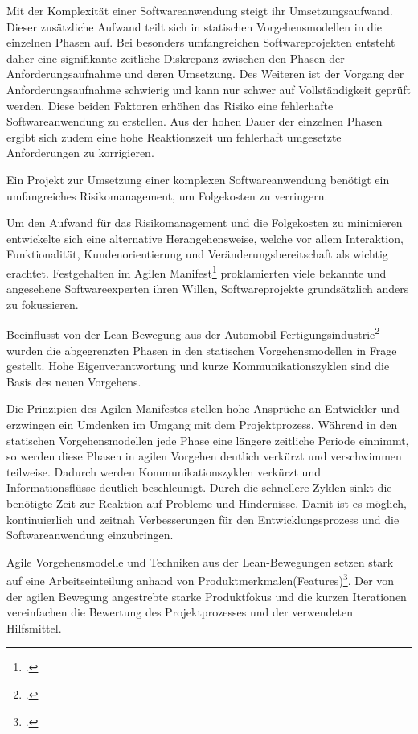 Mit der Komplexität einer Softwareanwendung steigt ihr Umsetzungsaufwand. Dieser zusätzliche Aufwand teilt sich in statischen Vorgehensmodellen in die einzelnen Phasen auf. Bei besonders umfangreichen Softwareprojekten entsteht daher eine signifikante zeitliche Diskrepanz zwischen den Phasen der Anforderungsaufnahme und deren Umsetzung. Des Weiteren ist der Vorgang der Anforderungsaufnahme schwierig und kann nur schwer auf Vollständigkeit geprüft werden. Diese beiden Faktoren erhöhen das Risiko eine fehlerhafte Softwareanwendung zu erstellen. Aus der hohen Dauer der einzelnen Phasen ergibt sich zudem eine hohe Reaktionszeit um fehlerhaft umgesetzte Anforderungen zu korrigieren.

Ein Projekt zur Umsetzung einer komplexen Softwareanwendung benötigt ein umfangreiches Risikomanagement, um Folgekosten 
zu verringern.

Um den Aufwand für das Risikomanagement und die Folgekosten zu minimieren entwickelte sich eine alternative
Herangehensweise, welche vor allem Interaktion, Funktionalität, Kundenorientierung und Veränderungsbereitschaft als
wichtig erachtet. Festgehalten im Agilen Manifest\footcite[vgl.][]{agile-manifest} proklamierten viele bekannte und angesehene
Softwareexperten ihren Willen, Softwareprojekte grundsätzlich anders zu fokussieren.

Beeinflusst von der Lean-Bewegung aus der Automobil-Fertigungsindustrie\footcite[vgl.][]{kent1999} wurden die abgegrenzten Phasen 
in den statischen Vorgehensmodellen in Frage gestellt. Hohe Eigenverantwortung und kurze Kommunikationszyklen sind die 
Basis des neuen Vorgehens.

Die Prinzipien des \glqq Agilen Manifestes\grqq{} stellen hohe Ansprüche an Entwickler und erzwingen ein Umdenken im Umgang mit dem Projektprozess. Während in den statischen Vorgehensmodellen jede Phase eine längere zeitliche Periode einnimmt, so werden diese Phasen in agilen Vorgehen deutlich verkürzt und verschwimmen teilweise. Dadurch werden Kommunikationszyklen verkürzt und Informationsflüsse deutlich beschleunigt.
Durch die schnellere Zyklen sinkt die benötigte Zeit zur Reaktion auf Probleme und Hindernisse. Damit ist es möglich, kontinuierlich und zeitnah Verbesserungen für den Entwicklungsprozess und die Softwareanwendung einzubringen. 

Agile Vorgehensmodelle und Techniken aus der Lean-Bewegungen setzen stark auf eine Arbeitseinteilung anhand von Produktmerkmalen(Features)\footcite[vgl.][Kap. 6. Product Backlog]{rubin-scrum}. Der von der agilen Bewegung angestrebte starke Produktfokus und die kurzen Iterationen vereinfachen die Bewertung des Projektprozesses und der verwendeten Hilfsmittel.

